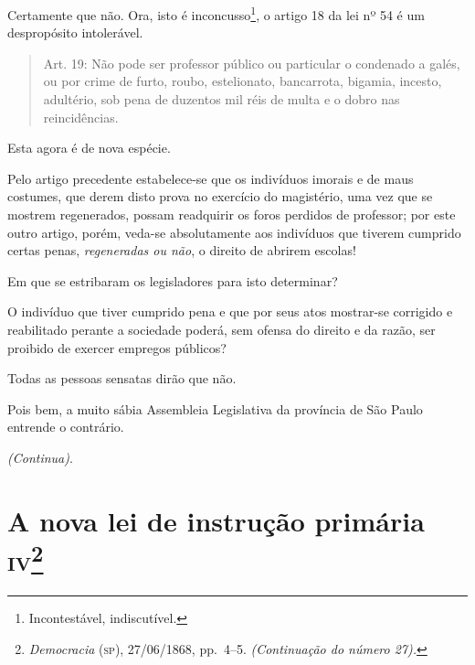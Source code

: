 Certamente que não. Ora, isto é inconcusso\footnote{Incontestável,
  indiscutível.}, o artigo 18 da lei nº 54 é um despropósito
intolerável.

\begin{quote}
Art. 19: Não pode ser professor público ou particular o condenado a
galés, ou por crime de furto, roubo, estelionato, bancarrota, bigamia,
incesto, adultério, sob pena de duzentos mil réis de multa e o dobro nas
reincidências.
\end{quote}

Esta agora é de nova espécie.

Pelo artigo precedente estabelece-se que os indivíduos imorais e de maus
costumes, que derem disto prova no exercício do magistério, uma vez que
se mostrem regenerados, possam readquirir os foros perdidos de
professor; por este outro artigo, porém, veda-se absolutamente aos
indivíduos que tiverem cumprido certas penas, \emph{regeneradas ou não},
o direito de abrirem escolas!

Em que se estribaram os legisladores para isto determinar?

O indivíduo que tiver cumprido pena e que por seus atos mostrar-se
corrigido e reabilitado perante a sociedade poderá, sem ofensa do
direito e da razão, ser proibido de exercer empregos públicos?

Todas as pessoas sensatas dirão que não.

Pois bem, a muito sábia Assembleia Legislativa da província de São Paulo
entrende o contrário.

\emph{(Continua)}.

\chapter{A nova lei de instrução primária \textsc{iv}\footnote{\emph{Democracia} (\textsc{sp}), 27/06/1868, pp.~4--5. \emph{(Continuação do
  número 27).}}}

